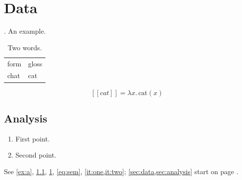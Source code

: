 \documentclass{article}
\begin{document}
\section{Data}\label{sec:data}
\ex.\label{ex:a} An example.

\begin{table}[h]
\centering
\begin{tabular}{ll} form & gloss \\ chat & cat \\ \end{tabular}
\caption{Two words.}\label{tab:words}
\end{table}

\begin{equation}\label{eq:sem} [\![\textit{cat}]\!] = \lambda x.\,\mathrm{cat}(x) \end{equation}

\subsection{Analysis}\label{sec:analysis}
\begin{enumerate}
\item First point.\label{it:one}
\item Second point.\label{it:two}
\end{enumerate}

See \ref{ex:a}, \cref{sec:analysis}, \cref{tab:words}, \eqref{eq:sem},
\cref{it:one,it:two}; \cref{sec:data,sec:analysis} start on
page \pageref{sec:data}.
\end{document}
